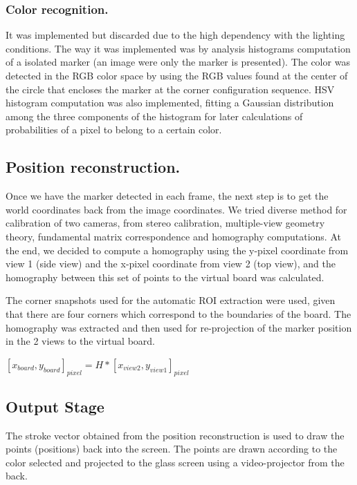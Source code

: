 \documentclass[a4paper,12pt]{article}
\begin{document}
\subsubsection{Color recognition.}
It was implemented but discarded due to the high dependency with the lighting conditions. The way it was implemented was by analysis histograms computation of a isolated marker (an image were only the marker is presented). The color was detected in the RGB color space by using the RGB values found at the center of the circle that encloses the marker at the corner configuration sequence. HSV histogram computation was also implemented, fitting a Gaussian distribution among the three components of the histogram for later calculations of probabilities of a pixel to belong to a certain color.

\subsection{Position reconstruction.} 
Once we have the marker detected in each frame, the next step is to get the world coordinates back from the image coordinates. We tried diverse method for calibration of two cameras, from stereo calibration, multiple-view geometry theory, fundamental matrix correspondence and homography computations. At the end, we decided to compute a homography using the y-pixel coordinate from view 1 (side view) and the x-pixel coordinate from view 2 (top view), and the homography between this set of points to the virtual board was calculated. 

The corner snapshots used for the automatic ROI extraction were used, given that there are four corners which correspond to the boundaries of the board. The homography was extracted and then used for re-projection of the marker position in the 2 views to the virtual board.

\begin{center}
$ [x_{board}, y_{board}]_{pixel}= H*[x_{view2}, y_{view1}]_{pixel} $
\end{center}


\subsection{Output Stage} 
The stroke vector obtained from the position reconstruction is used to draw the points (positions) back into the screen. The points are drawn according to the color selected and projected to the glass screen using a video-projector from the back.
\end{document}
